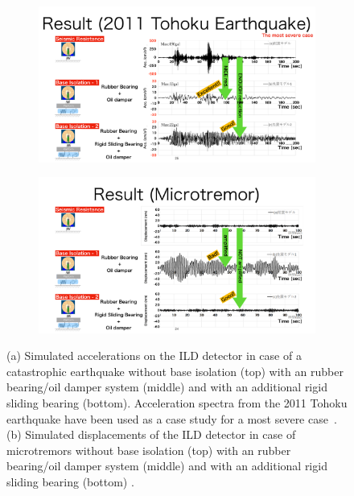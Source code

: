\begin{figure}[h!]
\begin{center}
\begin{subfigure}{0.9\hsize} \includegraphics[width=\textwidth]{Integration/fig/Damping_Earthquake.pdf}
 \caption{ \label{ild:fig:integration:damping_earthquake}}
 \end{subfigure}
\hspace{0.03\textwidth}
\begin{subfigure}{0.9\hsize} \includegraphics[width=\textwidth]{Integration/fig/Damping_Microtremor.pdf}
 \caption{  \label{ild:fig:integration:damping_microtremor}}
 \end{subfigure}
\end{center}
\caption{
(a) Simulated accelerations on the ILD detector in case of a catastrophic earthquake without base isolation (top) with an rubber bearing/oil damper system (middle) and with an additional rigid sliding bearing (bottom). Acceleration spectra from the 2011 Tohoku earthquake have been used as a case study for a most severe case~\cite{ild:bib:Seismic_Damping}.
(b) Simulated displacements of the ILD detector in case of microtremors without base isolation (top) with an rubber bearing/oil damper system (middle) and with an additional rigid sliding bearing (bottom) \cite{ild:bib:Seismic_Damping}.
}
\end{figure}


